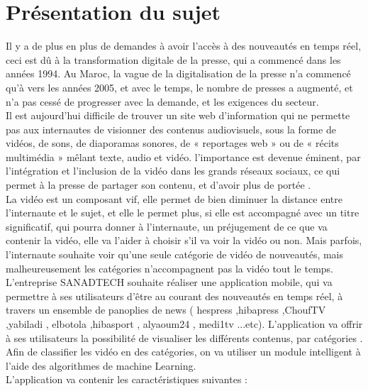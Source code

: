 \section{Présentation du sujet}
Il y a de plus en plus de demandes à avoir l'accès à des nouveautés en temps réel, ceci est dû à la transformation digitale de la presse, qui a commencé dans les années 1994. Au Maroc, la vague de la digitalisation de la presse n'a commencé qu'à vers les années 2005, et avec le temps, le nombre de presses a augmenté, et n'a pas cessé de progresser avec la demande, et les exigences du secteur.\\[0.5cm]
Il est aujourd’hui difficile de trouver un site web d’information qui ne permette pas aux internautes de visionner des contenus audiovisuels, sous la forme de vidéos, de sons, de diaporamas sonores, de « reportages web » ou de « récits multimédia » mêlant texte, audio et vidéo. l'importance est devenue éminent, par l'intégration et l'inclusion de la vidéo dans les grands réseaux sociaux, ce qui permet à la presse de partager son contenu, et d'avoir plus de portée .\\[0.5cm]
La vidéo est un composant vif, elle permet de bien diminuer la distance entre l'internaute et le sujet, et elle le permet plus, si elle est accompagné avec un titre significatif, qui pourra donner à l'internaute, un préjugement de ce que va contenir la vidéo, elle va l'aider à choisir s'il va voir la vidéo ou non. Mais parfois, l'internaute souhaite voir qu'une seule catégorie de vidéo de nouveautés, mais malheureusement les catégories n'accompagnent pas la vidéo tout le temps.\\[0.5cm]
L'entreprise SANADTECH souhaite réaliser une application mobile, qui va permettre à ses utilisateurs d'être au courant des nouveautés en temps réel, à travers un ensemble de panoplies de news ( hespress ,hibapress ,ChoufTV ,yabiladi , elbotola ,hibasport , alyaoum24 , medi1tv ...etc). L'application va offrir à ses utilisateurs la possibilité de visualiser les différents contenus, par catégories 	.\\[1cm]
Afin de classifier les vidéo en des catégories, on va utiliser un module intelligent à l'aide  des algorithmes de machine Learning.\\[0.5cm]
L'application va contenir les caractéristiques suivantes :
